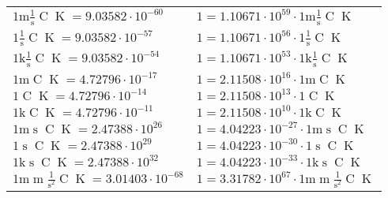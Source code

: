 \begin{center}
\begin{longtable}{l l}
{\color{gray}$1 \bm{\mathrm{ m}}{}\frac1{\operatorname{s}}{\operatorname{C}}{\operatorname{K}} = 9.03582\cdot10^{-60} $}   & {\color{gray}$ 1 = 1.10671\cdot10^{59} \cdot 1 \bm{\mathrm{ m}}{}\frac1{\operatorname{s}}{\operatorname{C}}{\operatorname{K}}$}  \\
{\color{black}$1 \bm{\mathrm{ }}{}\frac1{\operatorname{s}}{\operatorname{C}}{\operatorname{K}} = 9.03582\cdot10^{-57} $}   & {\color{black}$ 1 = 1.10671\cdot10^{56} \cdot 1 \bm{\mathrm{ }}{}\frac1{\operatorname{s}}{\operatorname{C}}{\operatorname{K}}$}  \\
{\color{gray}$1 \bm{\mathrm{ k}}{}\frac1{\operatorname{s}}{\operatorname{C}}{\operatorname{K}} = 9.03582\cdot10^{-54} $}   & {\color{gray}$ 1 = 1.10671\cdot10^{53} \cdot 1 \bm{\mathrm{ k}}{}\frac1{\operatorname{s}}{\operatorname{C}}{\operatorname{K}}$}  \\
{\color{gray}$1 \bm{\mathrm{ m}}{}{}{\operatorname{C}}{\operatorname{K}} = 4.72796\cdot10^{-17} $}   & {\color{gray}$ 1 = 2.11508\cdot10^{16} \cdot 1 \bm{\mathrm{ m}}{}{}{\operatorname{C}}{\operatorname{K}}$}  \\
{\color{black}$1 \bm{\mathrm{ }}{}{}{\operatorname{C}}{\operatorname{K}} = 4.72796\cdot10^{-14} $}   & {\color{black}$ 1 = 2.11508\cdot10^{13} \cdot 1 \bm{\mathrm{ }}{}{}{\operatorname{C}}{\operatorname{K}}$}  \\
{\color{gray}$1 \bm{\mathrm{ k}}{}{}{\operatorname{C}}{\operatorname{K}} = 4.72796\cdot10^{-11} $}   & {\color{gray}$ 1 = 2.11508\cdot10^{10} \cdot 1 \bm{\mathrm{ k}}{}{}{\operatorname{C}}{\operatorname{K}}$}  \\
{\color{gray}$1 \bm{\mathrm{ m}}{}{\operatorname{s}}{\operatorname{C}}{\operatorname{K}} = 2.47388\cdot10^{26} $}   & {\color{gray}$ 1 = 4.04223\cdot10^{-27} \cdot 1 \bm{\mathrm{ m}}{}{\operatorname{s}}{\operatorname{C}}{\operatorname{K}}$}  \\
{\color{black}$1 \bm{\mathrm{ }}{}{\operatorname{s}}{\operatorname{C}}{\operatorname{K}} = 2.47388\cdot10^{29} $}   & {\color{black}$ 1 = 4.04223\cdot10^{-30} \cdot 1 \bm{\mathrm{ }}{}{\operatorname{s}}{\operatorname{C}}{\operatorname{K}}$}  \\
{\color{gray}$1 \bm{\mathrm{ k}}{}{\operatorname{s}}{\operatorname{C}}{\operatorname{K}} = 2.47388\cdot10^{32} $}   & {\color{gray}$ 1 = 4.04223\cdot10^{-33} \cdot 1 \bm{\mathrm{ k}}{}{\operatorname{s}}{\operatorname{C}}{\operatorname{K}}$}  \\
{\color{gray}$1 \bm{\mathrm{ m}}{\operatorname{m}}\frac1{\operatorname{s}^2}{\operatorname{C}}{\operatorname{K}} = 3.01403\cdot10^{-68} $}   & {\color{gray}$ 1 = 3.31782\cdot10^{67} \cdot 1 \bm{\mathrm{ m}}{\operatorname{m}}\frac1{\operatorname{s}^2}{\operatorname{C}}{\operatorname{K}}$}  \\

\end{longtable}
\end{center}
